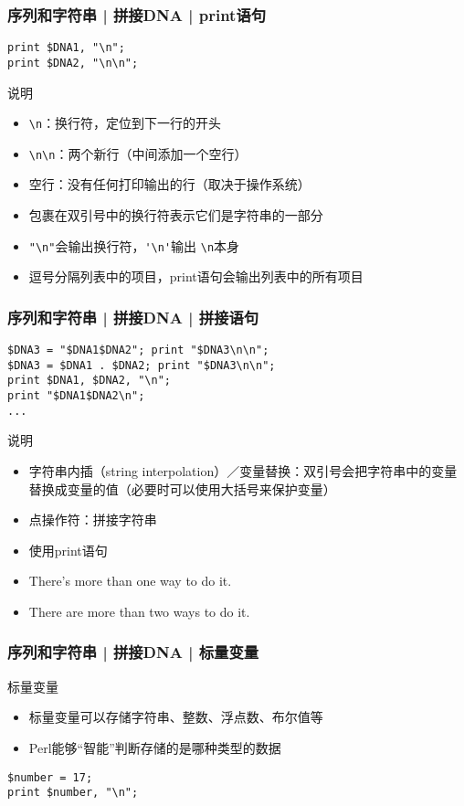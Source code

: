 \begin{frame}[fragile]
  \frametitle{序列和字符串 | 拼接DNA | \alert{print语句}}
\begin{lstlisting}
print $DNA1, "\n";
print $DNA2, "\n\n";
\end{lstlisting}
\pause
\begin{block}{说明}
  \begin{itemize}
    \item \verb|\n|：换行符，定位到下一行的开头
    \item \verb|\n\n|：两个新行（中间添加一个空行）
    \item 空行：没有任何打印输出的行（取决于操作系统）
    \item 包裹在双引号中的换行符表示它们是字符串的一部分
    \item \verb|"\n"|会输出换行符，\verb|'\n'|输出 \verb|\n|本身
    \item 逗号分隔列表中的项目，print语句会输出列表中的所有项目
  \end{itemize}
\end{block}
\end{frame}

\begin{frame}[fragile]
  \frametitle{序列和字符串 | 拼接DNA | \alert{拼接语句}}
\begin{lstlisting}
$DNA3 = "$DNA1$DNA2"; print "$DNA3\n\n";
$DNA3 = $DNA1 . $DNA2; print "$DNA3\n\n";
print $DNA1, $DNA2, "\n";
print "$DNA1$DNA2\n";
...
\end{lstlisting}
\begin{block}{说明}
\begin{itemize}
  \item 字符串内插（string interpolation）／变量替换：双引号会把字符串中的变量替换成变量的值（必要时可以使用大括号来保护变量）
  \item 点操作符：拼接字符串
  \item 使用print语句
  \item There's more than one way to do it.
  \item There are more than two ways to do it.
\end{itemize}
\end{block}
\end{frame}

\begin{frame}[fragile]
  \frametitle{序列和字符串 | 拼接DNA | 标量变量}
  \begin{block}{标量变量}
    \begin{itemize}
      \item 标量变量可以存储字符串、整数、浮点数、布尔值等
      \item Perl能够“智能”判断存储的是哪种类型的数据
    \end{itemize}
  \end{block}
  \pause
\begin{lstlisting}
$number = 17;
print $number, "\n";
\end{lstlisting}
\end{frame}


